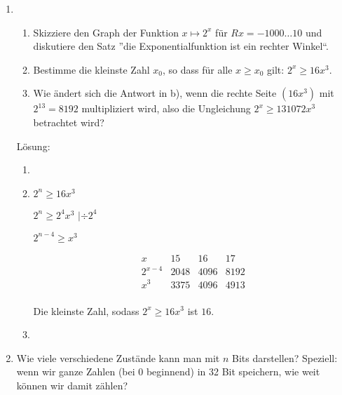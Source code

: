 \documentclass[../main.tex]{subfiles}
\begin{document}
\begin{enumerate}
\begin{enumerate}
	      \end{enumerate}
	\item \begin{enumerate}
		      \item Skizziere den Graph der Funktion \( x \mapsto 2^x \) für \(Rx = -1000 \dots 10 \)
		            und diskutiere den Satz ”die Exponentialfunktion ist ein rechter Winkel“.
		      \item Bestimme die kleinste Zahl \( x_0 \), so dass für alle \( x \geq x_0 \)
		            gilt: \( 2^x \geq 16x^3 \).
		      \item Wie ändert sich die Antwort in b),
		            wenn die rechte Seite \( (16x^3) \) mit \( 2^{13} = 8192 \)
		            multipliziert wird, also die Ungleichung \( 2^x \geq 131072 x^3 \) betrachtet wird?
	      \end{enumerate}

	      Lösung:
	      \begin{enumerate}
		      \item
		      \item \( 2^n \geq 16x^3 \)

		            \( 2^n \geq 2^4x^3 \) \( | \div 2^4 \)

		            \( 2^{n-4} \geq x^3 \)

		            \[ \begin{array}{c|ccc}
				            x         & 15   & 16   & 17   \\
				            \hline
				            2^{x - 4} & 2048 & 4096 & 8192 \\
				            x^3       & 3375 & 4096 & 4913 \\
			            \end{array} \]

		            Die kleinste Zahl, sodass \( 2^x \geq 16x^3 \) ist \( 16 \).
		      \item
	      \end{enumerate}
	\item Wie viele verschiedene Zustände kann man mit \( n \) Bits darstellen?
	      Speziell: wenn wir ganze Zahlen (bei 0 beginnend) in 32 Bit speichern,
	      wie weit können wir damit zählen?


\end{enumerate}
\end{document}
